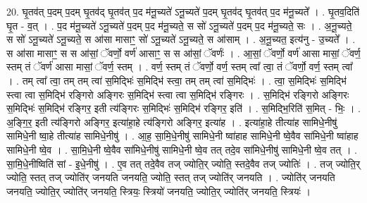 \documentclass[17pt]{extarticle}
\begin{document}
20. घृ॒तव॑त् प॒दम् प॒दम् घृ॒तव॑द् घृ॒तव॑त् प॒द म॑नू॒च्यते॑ ऽनू॒च्यते॑ प॒दम् घृ॒तव॑द् घृ॒तव॑त् प॒द म॑नू॒च्यते᳚ । . घृ॒तव॒दिति॑ घृ॒त - व॒त् । . प॒द म॑नू॒च्यते॑ ऽनू॒च्यते॑ प॒दम् प॒द म॑नू॒च्यते॒ स सो॑ ऽनू॒च्यते॑ प॒दम् प॒द म॑नू॒च्यते॒ सः । . अ॒नू॒च्यते॒ स सो॑ ऽनू॒च्यते॑ ऽनू॒च्यते॒ स आ॑सा मासाꣳ॒॒ सो॑ ऽनू॒च्यते॑ ऽनू॒च्यते॒ स आ॑साम् । . अ॒नू॒च्यत॒ इत्य॑नु - उ॒च्यते᳚ । . स आ॑सा मासाꣳ॒॒ स स आ॑सां॒ ॅवर्णो॒ वर्ण॑ आसाꣳ॒॒ स स आ॑सां॒ ॅवर्णः॑ । . आ॒सां॒ ॅवर्णो॒ वर्ण॑ आसा मासां॒ ॅवर्ण॒ स्तम् तं ॅवर्ण॑ आसा मासां॒ ॅवर्ण॒ स्तम् । . वर्ण॒ स्तम् तं ॅवर्णो॒ वर्ण॒ स्तम् त्वा᳚ त्वा॒ तं ॅवर्णो॒ वर्ण॒ स्तम् त्वा᳚ । . तम् त्वा᳚ त्वा॒ तम् तम् त्वा॑ स॒मिद्भिः॑ स॒मिद्भि॑ स्त्वा॒ तम् तम् त्वा॑ स॒मिद्भिः॑ । . त्वा॒ स॒मिद्भिः॑ स॒मिद्भि॑ स्त्वा त्वा स॒मिद्भि॑ रङ्गिरो अङ्गिरः स॒मिद्भि॑ स्त्वा त्वा स॒मिद्भि॑ रङ्गिरः । . स॒मिद्भि॑ रङ्गिरो अङ्गिरः स॒मिद्भिः॑ स॒मिद्भि॑ रङ्गिर॒ इती त्य॑ङ्गिरः स॒मिद्भिः॑ स॒मिद्भि॑ रङ्गिर॒ इति॑ । . स॒मिद्भि॒रिति॑ स॒मित् - भिः॒ । . अ॒ङ्गि॒र॒ इती त्य॑ङ्गिरो अङ्गिर॒ इत्या॑हा॒हे त्य॑ङ्गिरो अङ्गिर॒ इत्या॑ह । . इत्या॑हा॒हे तीत्या॑ह सामिधे॒नीषु॑ सामिधे॒नी ष्वा॒हे तीत्या॑ह सामिधे॒नीषु॑ । . आ॒ह॒ सा॒मि॒धे॒नीषु॑ सामिधे॒नी ष्वा॑हाह सामिधे॒नी ष्वे॒वैव सा॑मिधे॒नी ष्वा॑हाह सामिधे॒नी ष्वे॒व । . सा॒मि॒धे॒नी ष्वे॒वैव सा॑मिधे॒नीषु॑ सामिधे॒नी ष्वे॒व तत् तदे॒व सा॑मिधे॒नीषु॑ सामिधे॒नी ष्वे॒व तत् । . सा॒मि॒धे॒नीष्विति॑ सां - इ॒धे॒नीषु॑ । . ए॒व तत् तदे॒वैव तज् ज्योति॒र् ज्योति॒ स्तदे॒वैव तज् ज्योतिः॑ । . तज् ज्योति॒र् ज्योति॒ स्तत् तज् ज्योति॑र् जनयति जनयति॒ ज्योति॒ स्तत् तज् ज्योति॑र् जनयति । . ज्योति॑र् जनयति जनयति॒ ज्योति॒र् ज्योति॑र् जनयति॒ स्त्रियः॒ स्त्रियो॑ जनयति॒ ज्योति॒र् ज्योति॑र् जनयति॒ स्त्रियः॑ । \newline
\end{document}
